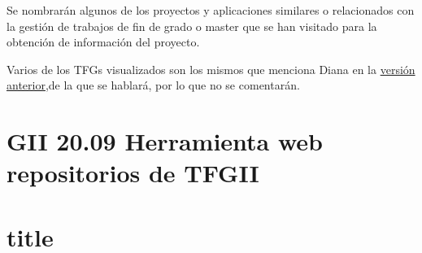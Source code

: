 Se nombrarán algunos de los proyectos y aplicaciones similares o relacionados con la gestión de trabajos de fin de grado o master que se han visitado para la obtención de información del proyecto.

Varios de los TFGs visualizados son los mismos que menciona Diana en la \href{https://github.com/dbo1001/Gestor-TFG-2021}{versión anterior},de la que se hablará, por lo que no se comentarán.  

\section{GII 20.09 Herramienta web repositorios de TFGII}

\section{title}
